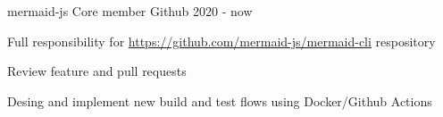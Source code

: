

\begin{cventries}

  \cventry
    {mermaid-js} %
    {Core member} %
    {Github} %
    {2020 - now} %
    {
      \begin{cvitems} %
        \item {Full responsibility for \url{https://github.com/mermaid-js/mermaid-cli} respository}
        \item {Review feature and pull requests}
        \item {Desing and implement new build and test flows using Docker/Github Actions}
      \end{cvitems}
    }

\end{cventries}
